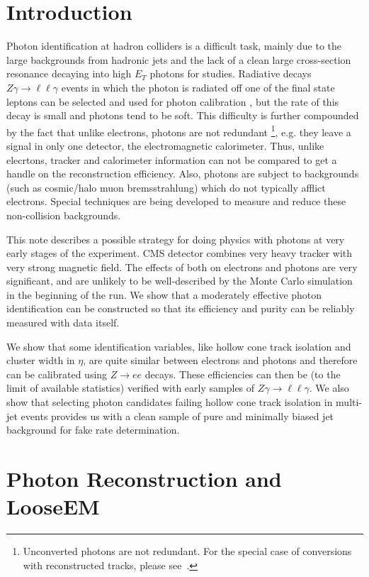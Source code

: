 \documentclass{cmspaper}
\begin{document}
\setcounter{page}{2}%

\section{Introduction}
Photon identification at hadron colliders is a difficult task, mainly due to the large backgrounds from hadronic jets and
the lack of a clean large cross-section resonance decaying into high $E_T$ photons for studies.  
Radiative decays $Z\gamma\rightarrow\ell\ell\gamma$ events in which the photon is radiated off one of the final state leptons 
can be selected and used for photon calibration \cite{uug_note}, but the rate of this decay is small and photons tend to be soft.
This difficulty is further compounded by the fact that unlike electrons,
photons are not redundant
\footnote{Unconverted photons are not redundant.  For the special case of conversions with reconstructed
tracks, please see~\cite{NancyConv}.}, e.g. they leave a signal in only one detector, the electromagnetic calorimeter.  
Thus, unlike elecrtons, tracker and calorimeter information can not be compared to get a handle on the reconstruction efficiency.
Also, photons are subject to backgrounds (such as cosmic/halo muon bremsstrahlung) which do not typically afflict electrons.
Special techniques are being developed to measure and reduce these non-collision backgrounds.

This note describes a possible strategy for doing physics with photons at very early stages of the experiment.
CMS detector combines very heavy tracker with very strong magnetic field. The effects of both on electrons and photons are very significant, and are 
unlikely to be well-described by the Monte Carlo simulation in the beginning of the run. 
We show that a moderately effective photon identification can be constructed so that its efficiency and purity can be reliably measured with
data itself.

We show that some identification variables, like hollow cone track isolation and cluster width in $\eta$, are quite similar between electrons and 
photons and therefore can be calibrated using $Z \rightarrow e e$ decays. 
These efficiencies can then be (to the limit of available statistics) verified with early samples of $Z\gamma\rightarrow\ell\ell\gamma$.  
We also show that selecting photon candidates failing hollow cone track isolation in multi-jet events 
provides us with a clean sample of pure and minimally biased jet background for fake rate determination.


\section{Photon Reconstruction and LooseEM}
\end{document}
